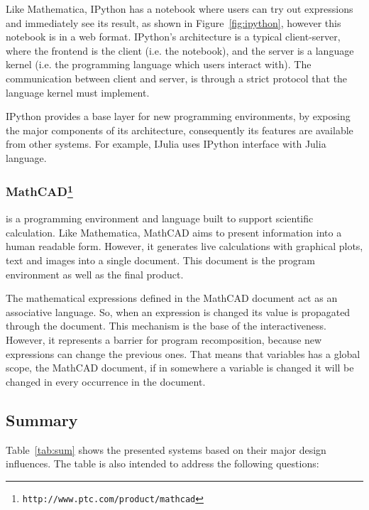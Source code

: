 Like Mathematica, IPython has a notebook where users can try out expressions and immediately see its result, as shown in Figure~\ref{fig:ipython}, however this notebook is in a web format. IPython's architecture is a typical client-server, where the frontend is the client (i.e. the notebook), and the server is a language kernel (i.e. the programming language which users interact with). The communication between client and server, is through a strict protocol that the language kernel must implement. 

IPython provides a base layer for new programming environments, by exposing the major components of its architecture, consequently its features are available from other systems. For example, IJulia uses IPython interface with Julia language. 
\subsubsection{MathCAD\protect\footnote{\texttt{http://www.ptc.com/product/mathcad}}} is a programming environment and language built to support scientific calculation. Like Mathematica, MathCAD aims to present information into a human readable form. However, it generates live calculations with graphical plots, text and images into a single document. This document is the program environment as well as the final product.

The mathematical expressions defined in the MathCAD document act as an associative language. So, when an expression is changed its value is propagated through the document. This mechanism is the base of the interactiveness. However, it represents a barrier for program recomposition, because new expressions can change the previous ones. That means that variables has a global scope, the MathCAD document, if in somewhere a variable is changed it will be changed in every occurrence in the document.   

\subsection{Summary}

Table~\ref{tab:sum} shows the presented systems based on their major design influences. The table is also intended to address the following questions:

